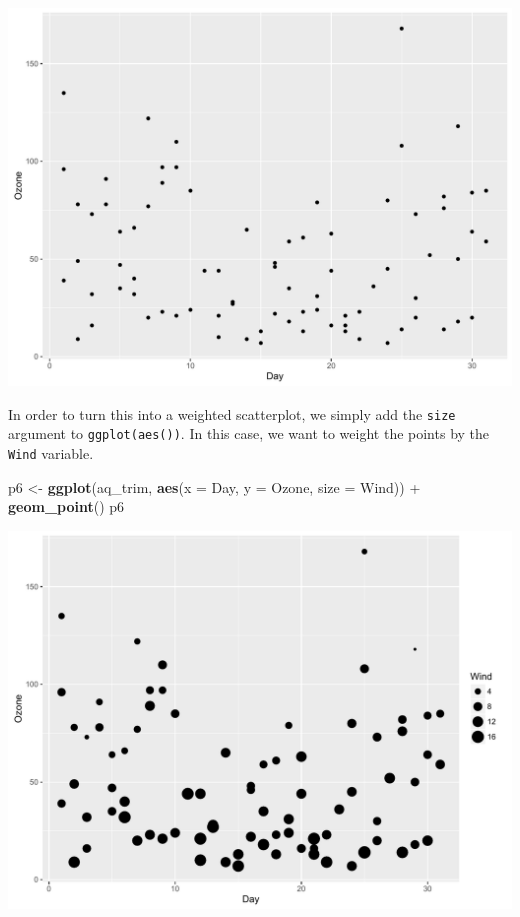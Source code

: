\documentclass[]{article}
\newenvironment{Shaded}{\begin{snugshade}}{\end{snugshade}}
\newcommand{\KeywordTok}[1]{\textcolor[rgb]{0.13,0.29,0.53}{\textbf{{#1}}}}
\newcommand{\DataTypeTok}[1]{\textcolor[rgb]{0.13,0.29,0.53}{{#1}}}
\newcommand{\StringTok}[1]{\textcolor[rgb]{0.31,0.60,0.02}{{#1}}}
\newcommand{\NormalTok}[1]{{#1}}
\begin{document}
\begin{center}\includegraphics{0_all_posts_pdf/wscatter_1-1} \end{center}

In order to turn this into a weighted scatterplot, we simply add the
\texttt{size} argument to \texttt{ggplot(aes())}. In this case, we want
to weight the points by the \texttt{Wind} variable.

\begin{Shaded}
\begin{Highlighting}[]
\NormalTok{p6 <-}\StringTok{ }\KeywordTok{ggplot}\NormalTok{(aq_trim, }\KeywordTok{aes}\NormalTok{(}\DataTypeTok{x =} \NormalTok{Day, }\DataTypeTok{y =} \NormalTok{Ozone, }\DataTypeTok{size =} \NormalTok{Wind)) +}\StringTok{ }
\StringTok{      }\KeywordTok{geom_point}\NormalTok{()}
\NormalTok{p6}
\end{Highlighting}
\end{Shaded}

\begin{center}\includegraphics{0_all_posts_pdf/wscatter_2-1} \end{center}
\end{document}
